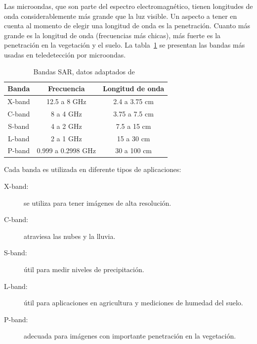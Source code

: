 Las microondas, que son parte del espectro electromagnético, tienen longitudes de onda considerablemente más grande que la luz visible. Un aspecto a tener en cuenta al momento de elegir una longitud de onda es la penetración. Cuanto más grande es la longitud de onda (frecuencias más chicas), más fuerte es la penetración en la vegetación y el suelo. La tabla~\ref{Bandas} se presentan las bandas más usadas en teledetección por microondas.

\begin{table}[H]
	\centering
	\begin{tabular}{ccc}
		\toprule
		\textbf{Banda}	& \textbf{Frecuencia}		    	& \textbf{Longitud de onda} \\ \midrule
		X-band			& 12.5 a 8 \si{\giga\hertz}         &  2.4 a 3.75 \si{\centi\meter} \\
		C-band			&  8 a 4 \si{\giga\hertz} 			&  3.75 a 7.5 \si{\centi\meter}\\
		S-band			&  4 a 2 \si{\giga\hertz} 	        &  7.5 a 15 \si{\centi\meter} \\
		L-band			&  2 a 1 \si{\giga\hertz} 	        &  15 a 30 \si{\centi\meter} \\
		P-band			&  0.999 a 0.2998 \si{\giga\hertz} 	&  30 a 100 \si{\centi\meter} \\
		\bottomrule
	\end{tabular}
	\caption{\label{Bandas}Bandas SAR, datos adaptados de~\cite{Sarmap2009}}
\end{table}

Cada banda es utilizada en diferente tipos de aplicaciones:

\begin{description}
\item[X-band:] se utiliza para tener imágenes de alta resolución.
\item[C-band:] atraviesa las nubes y la lluvia.
\item[S-band:] útil para medir niveles de precipitación.
\item[L-band:] útil para aplicaciones en agricultura y mediciones de humedad del suelo.
\item[P-band:] adecuada para  imágenes con importante penetración en la vegetación.
\end{description}


